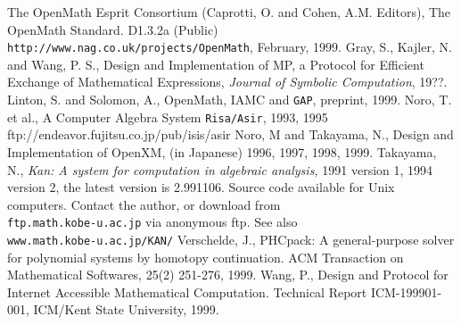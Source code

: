 \documentclass[submit]{acmconf}
\begin{document}
\begin{thebibliography}{X}
The OpenMath Esprit Consortium 
(Caprotti, O. and Cohen, A.M. Editors),
The OpenMath Standard. D1.3.2a (Public) \\
{\footnotesize \tt http://www.nag.co.uk/projects/OpenMath},
February, 1999.
Gray, S., Kajler, N. and Wang, P. S.,
Design and Implementation of MP, a Protocol for Efficient
  Exchange of Mathematical Expressions,
{\sl Journal of Symbolic Computation}, 19??.
Linton, S. and Solomon, A.,
OpenMath, IAMC and {\tt GAP},
preprint, 1999.
Noro, T. et al., 
A Computer Algebra System {\tt Risa/Asir},  1993, 1995\\
{\rm ftp://endeavor.fujitsu.co.jp/pub/isis/asir}
Noro, M and Takayama, N., Design and Implementation
of OpenXM, (in Japanese) 1996, 1997, 1998, 1999.
	Takayama, N.,
	{\em Kan: A system for computation in
	algebraic analysis,} 1991 version 1,
        1994 version 2, the latest version is 2.991106.
	Source code available for Unix computers. 
         Contact the author, or download from \\
	{\tt \small ftp.math.kobe-u.ac.jp} via anonymous ftp.
        See also \\ {\tt \small www.math.kobe-u.ac.jp/KAN/}
Verschelde, J.,
PHCpack: A general-purpose solver for polynomial systems by
homotopy continuation.  ACM Transaction on Mathematical Softwares, 25(2) 
251-276, 1999.
Wang, P.,
Design and Protocol for Internet Accessible Mathematical Computation.
Technical Report ICM-199901-001, ICM/Kent State University, 1999.
\end{thebibliography}
\end{document}
